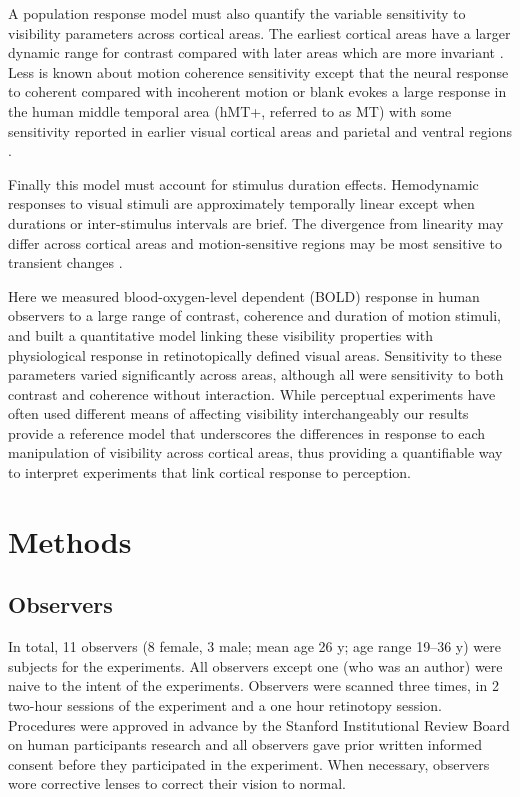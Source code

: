 A population response model must also quantify the variable sensitivity to visibility parameters across cortical areas. The earliest cortical areas have a larger dynamic range for contrast compared with later areas which are more invariant \citep{Avidan2002-jg,Cheng1994-ic,Rolls1986-wr,Sclar1990-lk}. Less is known about motion coherence sensitivity except that the neural response to coherent compared with incoherent motion or blank evokes a large response in the human middle temporal area (hMT+, referred to as MT) with some sensitivity reported in earlier visual cortical areas \citep{Ajina2015-xm,Costagli2014-kg,Dupont1994-yi,Heeger1999-ii,Watson1993-th,Zeki1991-zf} and parietal and ventral regions \citep{Braddick2001-pp}.

Finally this model must account for stimulus duration effects. Hemodynamic responses to visual stimuli are approximately temporally linear except when durations \citep{Boynton1996-ff,Boynton2012-xy} or inter-stimulus intervals \citep{Huettel2000-ji} are brief. The divergence from linearity may differ across cortical areas \citep{Birn2001-tp} and motion-sensitive regions may be most sensitive to transient changes \citep{Stigliani2017-oe}.

Here we measured blood-oxygen-level dependent (BOLD) \citep{Ogawa1990-er} response in human observers to a large range of contrast, coherence and duration of motion stimuli, and built a quantitative model linking these visibility properties with physiological response in retinotopically defined visual areas. Sensitivity to these parameters varied significantly across areas, although all were sensitivity to both contrast and coherence without interaction. While perceptual experiments have often used different means of affecting visibility interchangeably our results provide a reference model that underscores the differences in response to each manipulation of visibility across cortical areas, thus providing a quantifiable way to interpret experiments that link cortical response to perception.

\section{Methods}

\subsection{Observers}

In total, 11 observers (8 female, 3 male; mean age 26 y; age range 19–36 y) were subjects for the experiments. All observers except one (who was an author) were naive to the intent of the experiments. Observers were scanned three times, in 2 two-hour sessions of the experiment and a one hour retinotopy session. Procedures were approved in advance by the Stanford Institutional Review Board on human participants research and all observers gave prior written informed consent before they participated in the experiment. When necessary, observers wore corrective lenses to correct their vision to normal.

